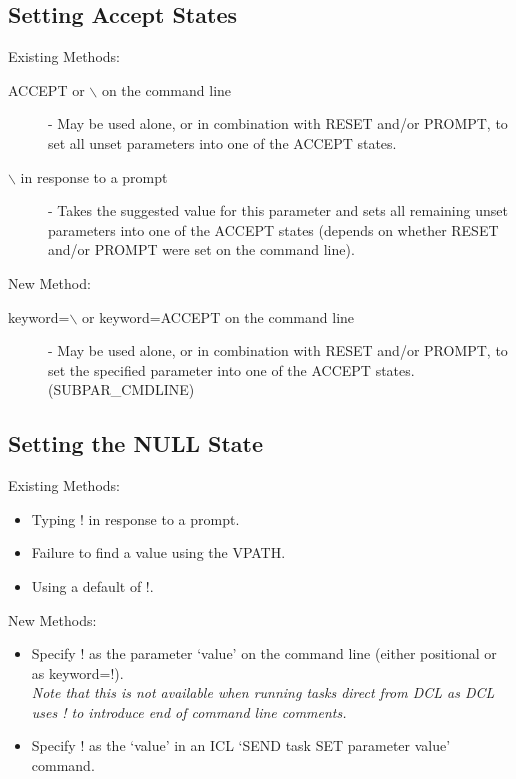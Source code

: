 \subsection{Setting Accept States}
Existing Methods:
\begin{description}
\item[ACCEPT or $\backslash$ on the command line] - May be used alone, or in 
combination with RE\-SET and/or PROMPT, to set all unset parameters into one 
of the ACCEPT states.
\item[$\backslash$ in response to a prompt] - Takes the suggested value for 
this parameter and sets all remaining unset parameters into one of the ACCEPT 
states (depends on whether RESET and/or PROMPT were set on the command line).
\end{description}
New Method:
\begin{description}
\item[keyword=$\backslash$ or keyword=ACCEPT on  the command line] - May be 
used alone, or in combination with RESET and/or PROMPT, to set the specified 
parameter into one of the ACCEPT states.
(SUBPAR\_CMDLINE)
\end{description}

\subsection{Setting the NULL State}
Existing Methods:
\begin{itemize}
\item Typing ! in response to a prompt.
\item Failure to find a value using the VPATH.
\item Using a default of !.
\end{itemize}
New Methods:
\begin{itemize}
\item Specify ! as the parameter `value' on the command line (either positional 
or as keyword=!).\\
{\em Note that this is not available when running tasks direct from DCL as DCL
uses ! to introduce end of command line comments.}
\item Specify ! as the `value' in an ICL `SEND task SET parameter value' command.
\end{itemize}

